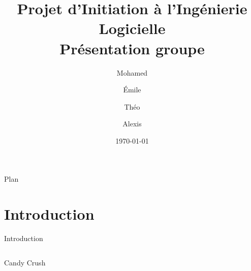 \documentclass{beamer}
\title[Projet d'Initiation à l'Ingénierie Logicielle]{Projet d'Initiation à l'Ingénierie Logicielle\\Présentation groupe \no 3}
\author[Groupe 3 : Mohamed, Émile, Théo, Alexis]{Mohamed \bsc{Lakhal} \and Émile \bsc{Jeannin} \\ \and Théo \bsc{Mottet} \and Alexis \bsc{Cabodi}}
\institute[UFC]{Université de Franche-Comté}
\date{\today}
\begin{document}
\maketitle

\begin{frame}{Plan}
	\tableofcontents
\end{frame}

\section{Introduction}
\begin{frame}{Introduction}
	\begin{columns}
		\begin{column}{0.49\textwidth} %
			\begin{block}{Candy Crush}
\end{block}
\end{column}
\end{columns}
\end{frame}
\end{document}
